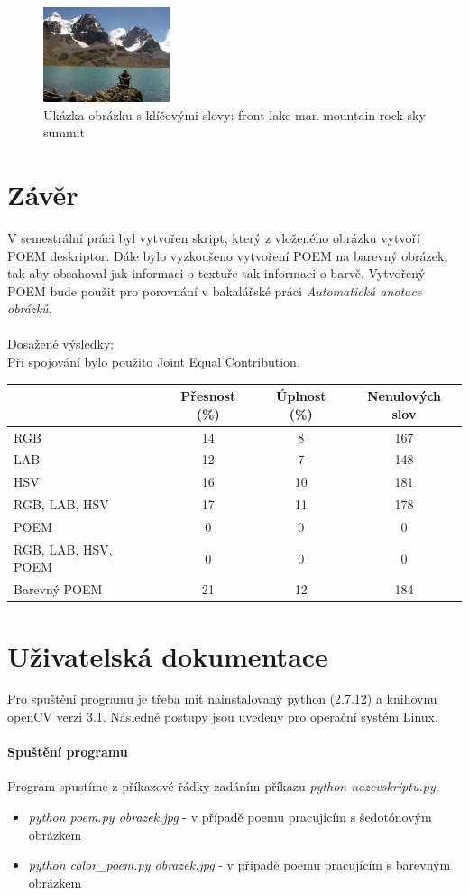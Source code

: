 \documentclass{report}
\begin{document}
\begin{figure}[h]
		\centering
		\includegraphics[width=140px]{./img/iaprtc12.jpg}	
		\caption{Ukázka obrázku s klíčovými slovy: front lake man mountain rock sky summit}
\end{figure}
 
\chapter{Závěr}
V semestrální práci byl vytvořen skript, který z vloženého obrázku vytvoří POEM deskriptor. Dále bylo vyzkoušeno vytvoření POEM na barevný obrázek, tak aby obsahoval jak informaci o textuře tak informaci o barvě. Vytvořený POEM bude použit pro porovnání v bakalářské práci \textit{Automatická anotace obrázků}. \\
\\
Dosažené výsledky: \\
Při spojování bylo použito Joint Equal Contribution. \cite{JEC} 

\begin{tabular}{l*{3}{c}}
	          		& Přesnost (\%) & Úplnost (\%) & Nenulových slov \\
\hline
RGB						& 14 & 8 & 167 \\
LAB	  			  		& 12 & 7 & 148  \\
HSV            			& 16 & 10 & 181  \\
RGB, LAB, HSV      		& 17 & 11 & 178  \\
POEM		     		& 0 & 0 & 0  \\
RGB, LAB, HSV, POEM		& 0 & 0 & 0  \\
Barevný POEM			& 21 & 12 & 184  \\
\end{tabular}


\chapter{Uživatelská dokumentace}
Pro spuštění programu je třeba mít nainstalovaný python (2.7.12) a knihovnu openCV verzi 3.1. Následné postupy jsou uvedeny pro operační systém Linux.

\subsubsection{Spuštění programu}
Program spustíme z příkazové řádky zadáním příkazu \textit{python nazevskriptu.py}. 
\begin{itemize}
	\item \textit{python poem.py obrazek.jpg} - v případě poemu pracujícím s šedotónovým obrázkem
	\item \textit{python color\_poem.py obrazek.jpg} - v případě poemu pracujícím s barevným obrázkem
\end{itemize}
\end{document}
